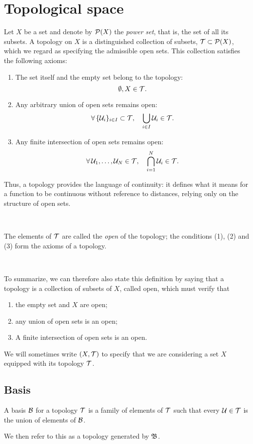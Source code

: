 \section{Topological space}

\begin{definition} 

 Let $X$ be a set and denote by $\mathcal{P}(X)$ the \emph{power set}, that is, the set of all its subsets. A topology on $X$ is a distinguished collection of subsets, $\mathcal{T} \subset \mathcal{P}(X)$, which we regard as specifying the admissible open sets. This collection satisfies the following axioms:
 \begin{enumerate}
\item The set itself and the empty set belong to the topology: \[\emptyset, X \in  \mathcal{T}.\]
\item Any arbitrary union of open sets remains open: \[\forall\, \{\mathcal{U}_{i}\}_{i\in I} \subset  \mathcal{T},\quad \bigcup\limits_{i\in I} \mathcal{U}_{i} \in  \mathcal{T}.\]
\item Any finite intersection of open sets remains open:  \[\forall \, \mathcal{U}_{1},\dots,\mathcal{U}_{N} \in \mathcal{T},  \quad \bigcap\limits_{i=1}^{N} \mathcal{U}_{i} \in  \mathcal{T}.\]
  \end{enumerate}
   \end{definition}
   
  Thus, a topology provides the language of continuity: it defines what it means for a function to be continuous without reference to distances, relying only on the structure of open sets. 
  
  \, 
  
   The elements of $ \mathcal{T}$ are called the {\sl open} of the topology; the conditions (1), (2) and (3) form  the axioms of a topology.

\, 

To summarize, we can therefore also state this definition by saying that a topology is a collection of subsets of $X$, called open, which must verify that
\begin{enumerate}
\item the empty set and $X$ are open;
\item any union of open sets is an open;
\item A finite intersection of open sets is an open.
\end{enumerate}

We will sometimes write $(X,\mathcal{T})$ to specify that we are considering a set $X$ equipped with its topology $\mathcal{T}$.

\subsection{Basis}
\begin{definition}[{\bf Basis}]
A basis $\mathcal{B}$ for a topology $\mathcal{T}$ is a family of elements of $\mathcal{T}$ such that every $\mathcal{U}\in \mathcal{T}$ is the union of elements of $\mathcal{B}$. 
\end{definition}
We then refer to this as a topology generated by $\mathfrak{B}$.


